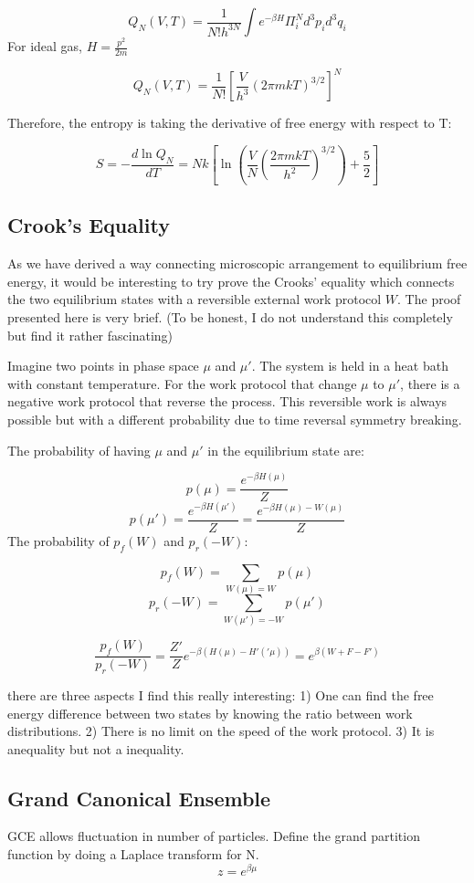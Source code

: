 \documentclass[12pt, oneside]{article}   	%
\begin{document}
$$Q_{N}(V,T) = \frac{1}{N! h^{3N}} \int e^{-\beta H} \Pi_i^{N} d^3 p_i d^3 q_i$$
For ideal gas, $H = \frac{p^2}{2m}$

$$Q_{N}(V,T) = \frac{1}{N!} [\frac{V}{h^3} (2 \pi m k T)^{3/2}]^N$$

Therefore, the entropy is taking the derivative of free energy with respect to T:

$$S = - \frac{d \ln Q_N}{d T} = Nk [\ln(\frac{V}{N} (\frac{2 \pi m k T}{h^2})^{3/2}) + \frac{5}{2}]$$

\subsection{Crook's Equality}
\par
As we have derived a way connecting microscopic arrangement to equilibrium free energy, it would be interesting to try prove the Crooks' equality which connects the two equilibrium states with a reversible external work protocol $W$. The proof presented here is very brief. (To be honest, I do not understand this completely but find it rather fascinating)
\par
Imagine two points in phase space $\mu$ and $\mu'$. The system is held in a heat bath with constant temperature. For the work protocol that change $\mu$ to $\mu'$, there is a negative work protocol that reverse the process. This reversible work is always possible but with a different probability due to time reversal symmetry breaking. 

The probability of having $\mu$ and $\mu'$ in the equilibrium state are:

$$p(\mu) = \frac{e^{-\beta H(\mu)}}{Z}$$
$$p(\mu') = \frac{e^{-\beta H(\mu')}}{Z} = \frac{e^{-\beta H(\mu)- W(\mu)}}{Z} $$
The probability of $p_f(W)$ and $p_r(-W)$: 

$$p_f(W) = \sum_{W(\mu) = W} p(\mu)$$
$$p_r(-W) = \sum_{W(\mu') = -W} p(\mu')$$

$$\frac{p_f(W)}{p_r(-W) }= \frac{Z'}{Z} e^{-\beta(H(\mu) - H'('\mu))} = e^{\beta(W + F - F')}$$

\par there are three aspects I find this really interesting: 1) One can find the free energy difference between two states by knowing the ratio between work distributions. 2) There is no limit on the speed of the work protocol. 3) It is anequality but not a inequality. 

\subsection{Grand Canonical Ensemble}
\par 
GCE allows fluctuation in number of particles. Define the grand partition function by doing a Laplace transform for N. 
$$z = e^{\beta \mu}$$
\end{document}
